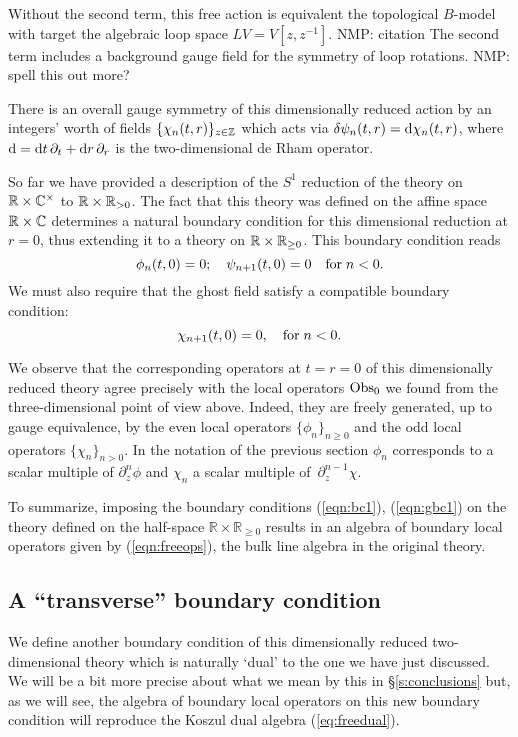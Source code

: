 \documentclass[11pt]{amsart}
\def\natalie#1{{\textcolor{green!65!black}{NMP: {#1}}}}
\begin{document}
Without the second term, this free action is equivalent the topological $B$-model with target the algebraic loop space $L V = V[z,z^{-1}]$.  \natalie{citation}
The second term includes a background gauge field for the symmetry of loop rotations. \natalie{spell this out more?}

There is an overall gauge symmetry of this dimensionally reduced action by an integers' worth of fields $\{\chi_n (t,r)\}_{z \in \mathbb Z}$ which acts via $\delta \psi_n (t,r) = {\rm d} \chi_n (t,r)$, where ${\rm d} = {\rm d} t \,\partial_t + {\rm d} r \,\partial_r$ is the two-dimensional de Rham operator. 

So far we have provided a description of the $S^1$ reduction of the theory on $\mathbb R \times \mathbb C^\times$ to $\mathbb R \times \mathbb R_{>0}$. 
The fact that this theory was defined on the affine space $\mathbb R \times \mathbb C$ determines a natural boundary condition for this dimensional reduction at $r = 0$, thus extending it to a theory on $\mathbb R \times \mathbb R_{\geq 0}$. 
This boundary condition reads
\begin{equation}\label{eqn:bc1}
\phi_n (t, 0) = 0 ; \quad \psi_{n+1} (t,0) = 0 \quad {\rm for} \; n < 0 .
\end{equation}
We must also require that the ghost field satisfy a compatible boundary condition:
\begin{equation}\label{eqn:gbc1}
\chi_{n+1} (t,0) = 0, \quad {\rm for} \; n < 0 .
\end{equation}

We observe that the corresponding operators at $t = r = 0$ of this dimensionally reduced theory agree precisely with the local operators ${\rm Obs}_0$ we found from the three-dimensional point of view above. 
Indeed, they are freely generated, up to gauge equivalence, by the even local operators $\{\phi_n\}_{n \geq 0}$ and the odd local operators $\{\chi_n\}_{n > 0}$. 
In the notation of the previous section $\phi_n$ corresponds to a scalar multiple of $\partial_z^n \phi$ and $\chi_n$ a scalar multiple of~$\partial^{n-1}_z \chi$. 

To summarize, imposing the boundary conditions (\ref{eqn:bc1}), (\ref{eqn:gbc1}) on the theory defined on the half-space $\mathbb{R} \times \mathbb{R}_{\geq 0}$ results in an algebra of boundary local operators given by (\ref{eqn:freeops}), the bulk line algebra in the original theory.  

\subsection{A ``transverse'' boundary condition}
%
We define another boundary condition of this dimensionally reduced two-dimensional theory which is naturally `dual' to the one we have just discussed. We will be a bit more precise about what we mean by this in \S \ref{s:conclusions} but, as we will see, the algebra of boundary local operators on this new boundary condition will reproduce the Koszul dual algebra (\ref{eq:freedual}).
\end{document}
